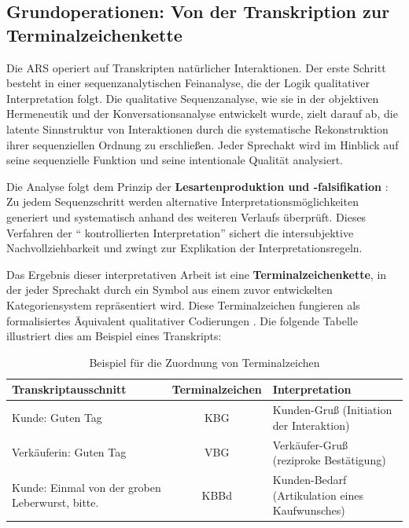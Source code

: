\documentclass[
  12pt,
  a4paper,
  oneside,
  titlepage
]{article}
\begin{document}
\subsection{Grundoperationen: Von der Transkription zur Terminalzeichenkette}

Die ARS operiert auf Transkripten natürlicher Interaktionen. Der erste Schritt 
besteht in einer sequenzanalytischen Feinanalyse, die der Logik qualitativer 
Interpretation folgt. Die qualitative Sequenzanalyse, wie sie in der objektiven 
Hermeneutik \citep{Oevermann1979} und der Konversationsanalyse 
\citep{Sacks1974} entwickelt wurde, zielt darauf ab, die latente Sinnstruktur 
von Interaktionen durch die systematische Rekonstruktion ihrer sequenziellen 
Ordnung zu erschließen. Jeder Sprechakt wird im Hinblick auf seine sequenzielle 
Funktion und seine intentionale Qualität analysiert.

Die Analyse folgt dem Prinzip der \textbf{Lesartenproduktion und -falsifikation} 
\citep[ S.~392]{Oevermann1979}: Zu jedem Sequenzschritt werden alternative 
Interpretationsmöglichkeiten generiert und systematisch anhand des weiteren 
Verlaufs überprüft. Dieses Verfahren der \enquote{ kontrollierten Interpretation} 
\citep[ S.~158]{Flick2019} sichert die intersubjektive Nachvollziehbarkeit und 
zwingt zur Explikation der Interpretationsregeln.

Das Ergebnis dieser interpretativen Arbeit ist eine \textbf{Terminalzeichenkette}, 
in der jeder Sprechakt durch ein Symbol aus einem zuvor entwickelten 
Kategoriensystem repräsentiert wird. Diese Terminalzeichen fungieren als 
formalisiertes Äquivalent qualitativer Codierungen \citep[ S.~207]{Przyborski2021}. 
Die folgende Tabelle illustriert dies am Beispiel eines Transkripts:

\begin{table}[h]
\centering
\caption{Beispiel für die Zuordnung von Terminalzeichen}
\label{tab:terminal}
\begin{tabular}{@{} p{6cm} c p{4cm} @{}}
\toprule
\textbf{Transkriptausschnitt} & \textbf{Terminalzeichen} & \textbf{Interpretation} \\
\midrule
Kunde: Guten Tag & KBG & Kunden-Gruß (Initiation der Interaktion) \\
Verkäuferin: Guten Tag & VBG & Verkäufer-Gruß (reziproke Bestätigung) \\
Kunde: Einmal von der groben Leberwurst, bitte. & KBBd & Kunden-Bedarf (Artikulation eines Kaufwunsches) \\
\bottomrule
\end{tabular}
\end{table}
\end{document}
